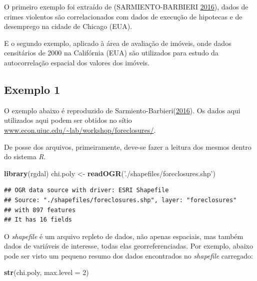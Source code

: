 \documentclass[12pt,]{article}
\newenvironment{Shaded}{\begin{snugshade}}{\end{snugshade}}
\newcommand{\KeywordTok}[1]{\textcolor[rgb]{0.13,0.29,0.53}{\textbf{{#1}}}}
\newcommand{\DataTypeTok}[1]{\textcolor[rgb]{0.13,0.29,0.53}{{#1}}}
\newcommand{\DecValTok}[1]{\textcolor[rgb]{0.00,0.00,0.81}{{#1}}}
\newcommand{\StringTok}[1]{\textcolor[rgb]{0.31,0.60,0.02}{{#1}}}
\newcommand{\NormalTok}[1]{{#1}}
\begin{document}
O primeiro exemplo foi extraído de (SARMIENTO-BARBIERI
\protect\hyperlink{ref-sarmiento-barbieri}{2016}), dados de crimes
violentos são correlacionados com dados de execução de hipotecas e de
desemprego na cidade de Chicago (EUA).

E o segundo exemplo, aplicado à área de avaliação de imóveis, onde dados
censitários de 2000 na Califórnia (EUA) são utilizados para estudo da
autocorrelação espacial dos valores dos imóveis.

\subsection{Exemplo 1}\label{exemplo-1}

O exemplo abaixo é reproduzido de
Sarmiento-Barbieri(\protect\hyperlink{ref-sarmiento-barbieri}{2016}). Os
dados aqui utilizados aqui podem ser obtidos no sítio
\href{http://www.econ.uiuc.edu/~lab/workshop/foreclosures/}{www.econ.uiuc.edu/\textasciitilde{}lab/workshop/foreclosures/}.

De posse dos arquivos, primeiramente, deve-se fazer a leitura dos mesmos
dentro do sistema \emph{R}.

\begin{Shaded}
\begin{Highlighting}[]
\KeywordTok{library}\NormalTok{(rgdal)}
\NormalTok{chi.poly <-}\StringTok{ }\KeywordTok{readOGR}\NormalTok{(}\StringTok{'./shapefiles/foreclosures.shp'}\NormalTok{)}
\end{Highlighting}
\end{Shaded}

\begin{verbatim}
## OGR data source with driver: ESRI Shapefile 
## Source: "./shapefiles/foreclosures.shp", layer: "foreclosures"
## with 897 features
## It has 16 fields
\end{verbatim}

O \emph{shapefile} é um arquivo repleto de dados, não apenas espaciais,
mas também dados de variáveis de interesse, todas elas
georreferenciadas. Por exemplo, abaixo pode ser visto um pequeno resumo
dos dados encontrados no \emph{shapefile} carregado:

\begin{Shaded}
\begin{Highlighting}[]
\KeywordTok{str}\NormalTok{(chi.poly, }\DataTypeTok{max.level =} \DecValTok{2}\NormalTok{)}
\end{Highlighting}
\end{Shaded}
\end{document}
